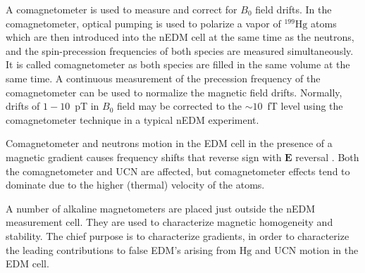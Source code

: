 A comagnetometer is used to measure and correct for  $B_0$ field drifts. 
In the comagnetometer, optical pumping is used to polarize a vapor of $^{199}\mathrm{Hg}$ atoms which are then introduced into the nEDM cell at the same time as the neutrons, and the spin-precession frequencies of both species are measured simultaneously. It is called comagnetometer as both species are filled in the same volume at the same time. A continuous measurement of the precession frequency of the comagnetometer can be used to normalize the magnetic field drifts. Normally, drifts of $1-10$~pT in $B_0$ field may be corrected to the $\sim10$~fT level using the comagnetometer technique in a typical nEDM experiment. 


Comagnetometer and neutrons motion in the EDM cell in the presence of a magnetic gradient causes frequency shifts that reverse sign with $\bm{E}$ reversal \cite{comag_1,comag_2,comag_3}. Both the comagnetometer and UCN are affected, but comagnetometer effects tend to dominate due to the higher (thermal) velocity of the atoms. 

A number of alkaline magnetometers are placed just outside the
nEDM measurement cell. They are used to characterize magnetic homogeneity and stability. The chief purpose is to characterize gradients, in order to characterize the leading contributions to false EDM's arising from $\mathrm{Hg}$ and UCN motion in the EDM cell.


